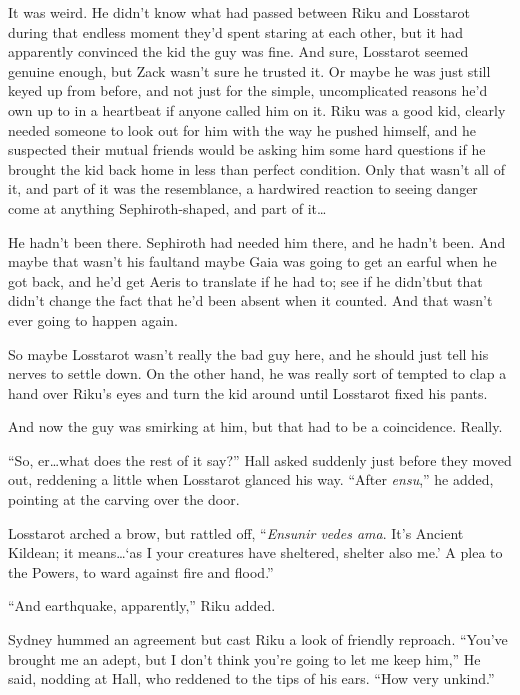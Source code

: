 \scenechange


It was weird. He didn't know what had passed between Riku and Losstarot during that endless moment they'd spent staring at each other, but it had apparently convinced the kid the guy was fine. And sure, Losstarot seemed genuine enough, but Zack wasn't sure he trusted it. Or maybe he was just still keyed up from before, and not just for the simple, uncomplicated reasons he'd own up to in a heartbeat if anyone called him on it. Riku was a good kid, clearly needed someone to look out for him with the way he pushed himself, and he suspected their mutual friends would be asking him some hard questions if he brought the kid back home in less than perfect condition. Only that wasn't all of it, and part of it was the resemblance, a hardwired reaction to seeing danger come at anything Sephiroth-shaped, and part of it\ldots

He hadn't been there. Sephiroth had needed him there, and he hadn't been. And maybe that wasn't his fault\textemdash and maybe Gaia was going to get an earful when he got back, and he'd get Aeris to translate if he had to; see if he didn't\textemdash but that didn't change the fact that he'd been absent when it counted. And that wasn't ever going to happen again.

So maybe Losstarot wasn't really the bad guy here, and he should just tell his nerves to settle down. On the other hand, he was really sort of tempted to clap a hand over Riku's eyes and turn the kid around until Losstarot fixed his pants.

And now the guy was smirking at him, but that had to be a coincidence. Really.

``So, er\ldots what does the rest of it say?'' Hall asked suddenly just before they moved out, reddening a little when Losstarot glanced his way. ``After \emph{ensu},'' he added, pointing at the carving over the door.

Losstarot arched a brow, but rattled off, ``\emph{Ensunir vedes ama}. It's Ancient Kildean; it means\ldots `as I your creatures have sheltered, shelter also me.' A plea to the Powers, to ward against fire and flood.''

``And earthquake, apparently,'' Riku added.

Sydney hummed an agreement but cast Riku a look of friendly reproach. ``You've brought me an adept, but I don't think you're going to let me keep him,'' He said, nodding at Hall, who reddened to the tips of his ears. ``How very unkind.''

